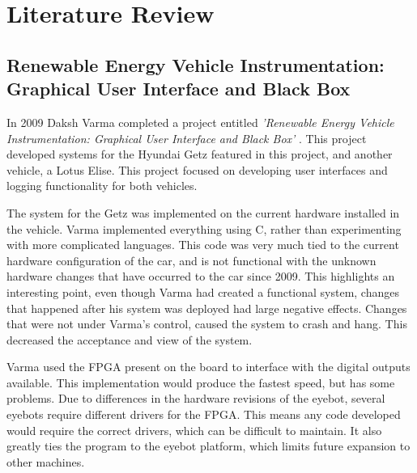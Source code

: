 
\chapter{Literature Review} %



\ifpdf
    \graphicspath{{X/figures/PNG/}{X/figures/PDF/}{X/figures/}}
\else
    \graphicspath{{X/figures/EPS/}{X/figures/}}
\fi



\section{Renewable Energy Vehicle Instrumentation:
Graphical User Interface and Black Box}

In 2009 Daksh Varma completed a project entitled \emph{'Renewable Energy Vehicle Instrumentation:
Graphical User Interface and Black Box'} \cite{thesis_varma}. This project developed systems for the Hyundai Getz featured in this project, and another vehicle, a Lotus Elise. This project focused on developing user interfaces and logging functionality for both vehicles.

The system for the Getz was implemented on the current hardware installed in the vehicle. Varma implemented everything using C, rather than experimenting with more complicated languages. This code was very much tied to the current hardware configuration of the car, and is not functional with the unknown hardware changes that have occurred to the car since 2009. This highlights an interesting point, even though Varma had created a functional system, changes that happened after his system was deployed had large negative effects. Changes that were not under Varma's control, caused the system to crash and hang. This decreased the acceptance and view of the system.

Varma used the FPGA present on the board to interface with the digital outputs available. This implementation would produce the fastest speed, but has some problems. Due to differences in the hardware revisions of the eyebot, several eyebots require different drivers for the FPGA. This means any code developed would require the correct drivers, which can be difficult to maintain. It also greatly ties the program to the eyebot platform, which limits future expansion to other machines.


